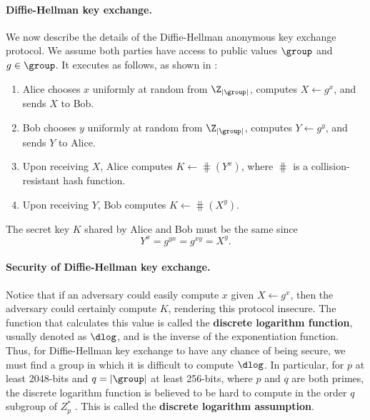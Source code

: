 
\paragraph{Diffie-Hellman key exchange.} We now describe the details of the Diffie-Hellman anonymous key exchange protocol. We assume both parties have access to public values $\group$ and $g\in\group$. It executes as follows, as shown in :
\begin{enumerate}
	\item Alice chooses $x$ uniformly at random from $\Z_{|\group|}$, computes $X \gets g^x$, and sends $X$ to Bob.
	
	\item Bob chooses $y$ uniformly at random from $\Z_{|\group|}$, computes $Y \gets g^y$, and sends $Y$ to Alice.
	
	\item Upon receiving $X$, Alice computes $K \gets \hash(Y^x)$, where $\hash$ is a collision-resistant hash function. 
	
	\item Upon receiving $Y$, Bob computes $K \gets \hash(X^y)$. 
\end{enumerate}

The secret key $K$ shared by Alice and Bob must be the same since
\begin{equation*}
	Y^x = g^{yx} = g^{xy} = X^y.
\end{equation*}

\paragraph{Security of Diffie-Hellman key exchange.} Notice that if an adversary could easily compute $x$ given $X \gets g^x$, then the adversary could certainly compute $K$, rendering this protocol insecure. The function that calculates this value is called the \textbf{discrete logarithm function}, usually denoted as $\dlog$, and is the inverse of the exponentiation function. Thus, for Diffie-Hellman key exchange to have any chance of being secure, we must find a group in which it is difficult to compute $\dlog$. In particular, for $p$ at least 2048-bits and $q = |\group|$ at least 256-bits, where $p$ and $q$ are both primes, the discrete logarithm function is believed to be hard to compute in the order $q$ subgroup of $Z_p^*$ \cite{BonehShoupBook}. This is called the \textbf{discrete logarithm assumption}.

